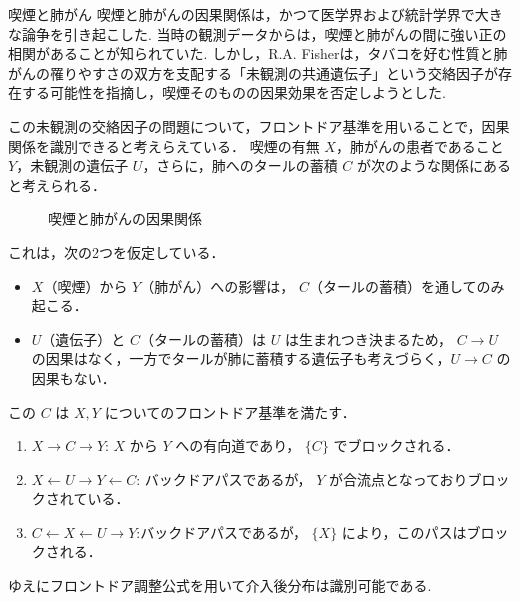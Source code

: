 \documentclass[uplatex, dvipdfmx]{jsarticle}
\begin{document}
\begin{exm}{喫煙と肺がん}
  喫煙と肺がんの因果関係は，かつて医学界および統計学界で大きな論争を引き起こした.
  当時の観測データからは，喫煙と肺がんの間に強い正の相関があることが知られていた.
  しかし，R.A. Fisherは，タバコを好む性質と肺がんの罹りやすさの双方を支配する「未観測の共通遺伝子」という交絡因子が存在する可能性を指摘し，喫煙そのものの因果効果を否定しようとした.

  この未観測の交絡因子の問題について，フロントドア基準を用いることで，因果関係を識別できると考えらえている．
  喫煙の有無 $X$，肺がんの患者であること $Y$，未観測の遺伝子 $U$，さらに，肺へのタールの蓄積 $C$ が次のような関係にあると考えられる．

  \begin{figure}[H]
    \centering
    \caption{喫煙と肺がんの因果関係}
  \end{figure}

  これは，次の2つを仮定している．
  \begin{itemize}
    \item $X$（喫煙）から $Y$（肺がん）への影響は， $C$（タールの蓄積）を通してのみ起こる．
    \item $U$（遺伝子）と $C$（タールの蓄積）は $U$ は生まれつき決まるため， $C \to U$ の因果はなく，一方でタールが肺に蓄積する遺伝子も考えづらく，$U \to C$ の因果もない．
  \end{itemize}

  この $C$ は $X, Y$ についてのフロントドア基準を満たす．
  \begin{enumerate}
    \item $X \to C \to Y$:
    $X$ から $Y$ への有向道であり， $\{C\}$ でブロックされる．
    \item $X \leftarrow U \to Y \leftarrow C$: バックドアパスであるが， $Y$ が合流点となっておりブロックされている．
    \item $C \leftarrow X \leftarrow U \to Y$:バックドアパスであるが， $\{X\}$ により，このパスはブロックされる．
  \end{enumerate}
  ゆえにフロントドア調整公式を用いて介入後分布は識別可能である.
\end{exm}
\end{document}
